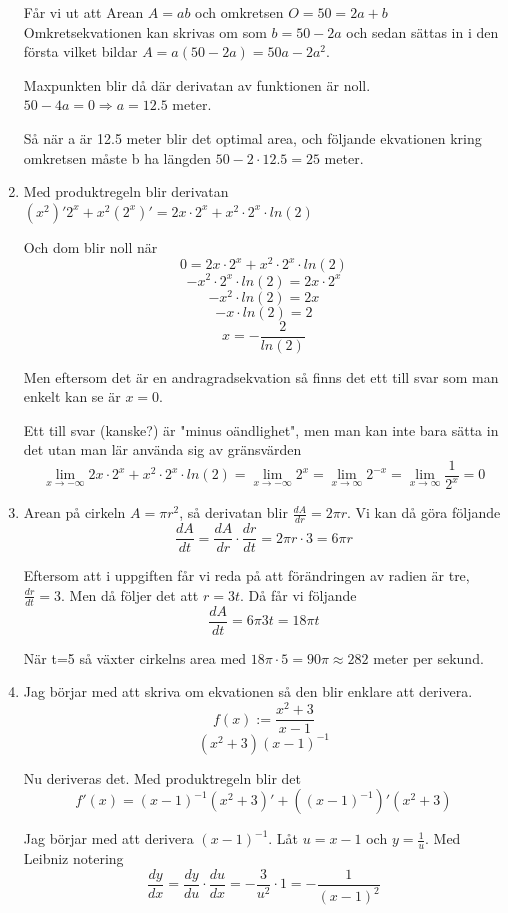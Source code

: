 \documentclass[a4paper,12pt]{article}
\begin{document}
\begin{enumerate}
    Får vi ut att Arean $A=ab$ och omkretsen $O=50=2a+b$
    Omkretsekvationen kan skrivas om som $b=50-2a$ och sedan 
    sättas in i den första vilket bildar $A=a(50-2a)=50a-2a^2$.

    Maxpunkten blir då där derivatan av funktionen är noll.
    $50-4a=0\Rightarrow a=12.5$ meter.

    Så när a är 12.5 meter blir det optimal area, och följande 
    ekvationen kring omkretsen måste b ha längden $50-2\cdot 12.5=25$ meter.

    \item 
    Med produktregeln blir derivatan
    $(x^2)'2^x+x^2(2^x)'=2x\cdot 2^x + x^2\cdot 2^x\cdot ln(2)$

    Och dom blir noll när 
    $$0=2x\cdot 2^x + x^2\cdot 2^x\cdot ln(2)$$
    $$-x^2\cdot 2^x\cdot ln(2)=2x\cdot 2^x $$
    $$-x^2\cdot ln(2)=2x$$
    $$-x\cdot ln(2)=2$$
    $$x=-\frac{2}{ln(2)}$$
    
    Men eftersom det är en andragradsekvation så finns det ett till 
    svar som man enkelt kan se är $x=0$.
    
    Ett till svar (kanske?) är "minus oändlighet", men man kan inte bara sätta
    in det utan man lär använda sig av gränsvärden
    $$\lim_{x\rightarrow -\infty}2x\cdot 2^x + x^2\cdot 2^x\cdot ln(2)
    =\lim_{x\rightarrow -\infty}2^{x}
    =\lim_{x\rightarrow \infty}2^{-x}
    =\lim_{x\rightarrow \infty}\frac{1}{2^x}
    =0$$

    \item 
    Arean på cirkeln $A=\pi r^2$, så derivatan blir $\frac{dA}{dr}=2\pi r$.
    Vi kan då göra följande
    $$\frac{dA}{dt}=\frac{dA}{dr}\cdot\frac{dr}{dt}=2\pi r \cdot 3 = 6\pi r$$

    Eftersom att i uppgiften får vi reda på att förändringen av radien är tre,
    $\frac{dr}{dt}=3$. 
    Men då följer det att $r=3t$.
    Då får vi följande $$\frac{dA}{dt}=6\pi 3t=18\pi t$$

    När t=5 så växter cirkelns area med $18 \pi\cdot 5=90\pi\approx 282$ meter per sekund.
    \item 
    Jag börjar med att skriva om ekvationen så den 
    blir enklare att derivera.
    $$f(x):=\frac{x^2+3}{x-1}$$
    $$(x^2+3)(x-1)^{-1}$$
    
    Nu deriveras det. Med produktregeln blir det 
    $$f'(x)=(x-1)^{-1}(x^2+3)'+((x-1)^{-1})'(x^2+3)$$
    
    Jag börjar med att derivera $(x-1)^{-1}$.
    Låt $u=x-1$ och $y=\frac{1}{u}$.
    Med Leibniz notering 
    $$\frac{dy}{dx}=\frac{dy}{du}\cdot \frac{du}{dx}
    =-\frac{3}{u^2}\cdot 1=-\frac{1}{(x-1)^2}$$
    

\end{enumerate}
\end{document}
